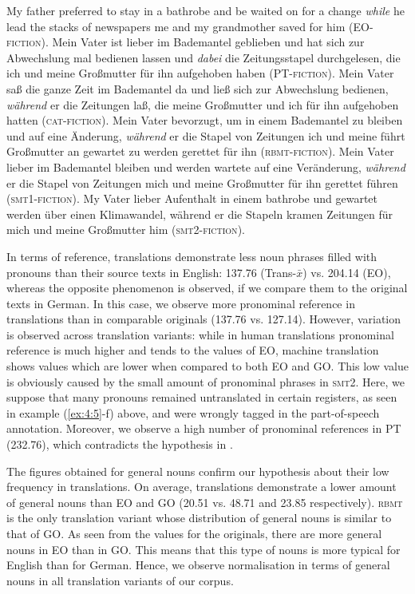 \documentclass[output=paper]{LSP/langsci}
\begin{document}
\ea \label{ex:4:5}
\ea My father preferred to stay in a bathrobe and be waited on for a change \textit{while} he lead the stacks of newspapers me and my grandmother saved for him (EO-\textsc{fiction}).
\ex Mein Vater ist lieber im Bademantel geblieben und hat sich zur Abwechslung mal bedienen lassen und \textit{dabei} die Zeitungsstapel durchgelesen, die ich und meine Großmutter für ihn aufgehoben haben (PT-\textsc{fiction}).
\ex Mein Vater saß die ganze Zeit im Bademantel da und ließ sich zur Abwechslung bedienen, \textit{während} er die Zeitungen laß, die meine Großmutter und ich für ihn aufgehoben hatten (\textsc{cat}-\textsc{fiction}).
\ex Mein Vater bevorzugt, um in einem Bademantel zu bleiben und auf eine Änderung, \textit{während} er die Stapel von Zeitungen ich und meine führt Großmutter an gewartet zu werden gerettet für ihn (\textsc{rbmt}-\textsc{fiction}). 
\ex Mein Vater lieber im Bademantel bleiben und werden wartete auf eine Veränderung, \textit{während} er die Stapel von Zeitungen mich und meine Großmutter für ihn gerettet führen (\textsc{smt}1-\textsc{fiction}).
\ex My Vater lieber Aufenthalt in einem bathrobe und gewartet werden über einen Klimawandel, während er die Stapeln kramen Zeitungen für mich und meine Großmutter him (\textsc{smt}2-\textsc{fiction}).
\z
\z

In terms of reference, translations demonstrate less noun phrases filled with pronouns than their source texts in English: 137.76 (Trans-$\bar{x}$) vs. 204.14 (EO), whereas the opposite phenomenon is observed, if we compare them to the original texts in German. In this case, we observe more pronominal reference in translations than in comparable originals (137.76 vs. 127.14). However, variation is observed across translation variants: while in human translations pronominal reference is much higher and tends to the values of EO, machine translation shows values which are lower when compared to both EO and GO. This low value is obviously caused by the small amount of pronominal phrases in \textsc{smt}2. Here, we suppose that many pronouns remained untranslated in certain registers, as seen in example (\ref{ex:4:5}-f) above, and were wrongly tagged in the part-of-speech annotation. Moreover, we observe a high number of pronominal references in PT (232.76), which contradicts the hypothesis in .

The figures obtained for general nouns confirm our hypothesis about their low frequency in translations. On average, translations demonstrate a lower amount of general nouns than EO and GO (20.51 vs. 48.71 and 23.85 respectively). \textsc{rbmt} is the only translation variant whose distribution of general nouns is similar to that of GO. As seen from the values for the originals, there are more general nouns in EO than in GO. This means that this type of nouns is more typical for English than for German. Hence, we observe normalisation in terms of general nouns in all translation variants of our corpus. 
\end{document}
